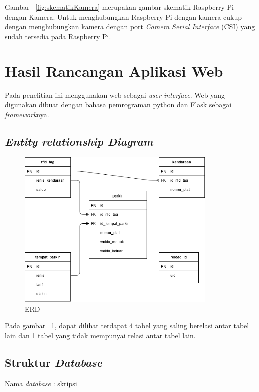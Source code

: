Gambar ~\ref{fig:skematikKamera} merupakan gambar skematik Raspberry Pi dengan Kamera. Untuk menghubungkan Raspberry Pi dengan kamera cukup dengan menghubungkan kamera dengan port \textit{Camera Serial Interface} (CSI) yang sudah tersedia pada Raspberry Pi.


\section{Hasil Rancangan Aplikasi Web}
Pada penelitian ini menggunakan web sebagai \textit{user interface}. Web yang digunakan dibuat dengan bahasa pemrograman python dan Flask sebagai \textit{framework}nya.

\subsection{\textit{Entity relationship Diagram}}
\begin{figure} [H]
    \includegraphics[width=0.85\textwidth, center]{images/er diagram.png}
    \caption{ERD}
    \label{fig:erd}
\end{figure}

Pada gambar ~\ref{fig:erd}, dapat dilihat terdapat 4 tabel yang saling berelasi antar tabel lain dan 1 tabel yang tidak mempunyai relasi antar tabel lain.

\subsection{Struktur \textit{Database}}
Nama \textit{database} : skripsi

